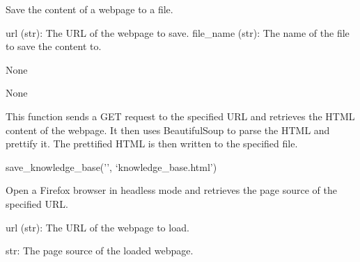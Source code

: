 \documentclass[letterpaper,10pt,english]{sphinxmanual}
\begin{document}
\begin{fulllineitems}
\label{\detokenize{Project.Script:Project.Script.RecupKbFortinet.save_knowledge_base}}
\pysigstartsignatures
{}
\pysigstopsignatures
\sphinxAtStartPar
Save the content of a webpage to a file.
\begin{description}
\sphinxAtStartPar
url (str): The URL of the webpage to save.
file\_name (str): The name of the file to save the content to.

\sphinxAtStartPar
None

\sphinxAtStartPar
None

\end{description}

\sphinxAtStartPar
This function sends a GET request to the specified URL and retrieves the HTML content of the webpage.
It then uses BeautifulSoup to parse the HTML and prettify it. The prettified HTML is then written to the specified file.
\begin{description}
\sphinxAtStartPar
save\_knowledge\_base(’’, ‘knowledge\_base.html’)

\end{description}

\end{fulllineitems}


\begin{fulllineitems}
\label{\detokenize{Project.Script:Project.Script.RecupKbFortinet.selenium}}
\pysigstartsignatures
{}
\pysigstopsignatures
\sphinxAtStartPar
Open a Firefox browser in headless mode and retrieves the page source of the specified URL.
\begin{description}
\sphinxAtStartPar
url (str): The URL of the webpage to load.

\sphinxAtStartPar
str: The page source of the loaded webpage.

\end{description}

\end{fulllineitems}
\end{document}
